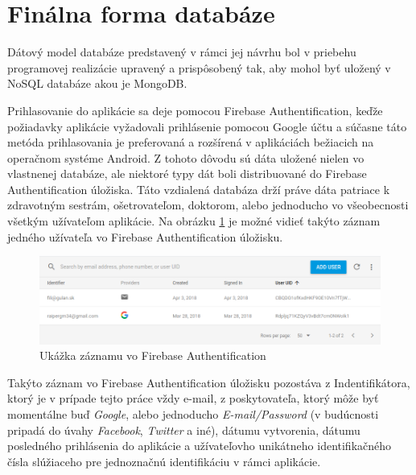 \section{Finálna forma databáze}
Dátový model databáze predstavený v rámci jej návrhu bol v priebehu programovej realizácie upravený a prispôsobený tak, aby mohol byť uložený v NoSQL databáze akou je MongoDB. 

Prihlasovanie do aplikácie sa deje pomocou Firebase Authentification, keďže požiadavky aplikácie vyžadovali prihlásenie pomocou Google účtu a súčasne táto metóda prihlasovania je preferovaná a rozšírená v aplikáciách bežiacich na operačnom systéme Android. Z tohoto dôvodu sú dáta uložené nielen vo vlastnenej databáze, ale niektoré typy dát boli distribuované do Firebase Authentification úložiska. Táto vzdialená databáza drží práve dáta patriace k zdravotným sestrám, ošetrovateľom, doktorom, alebo jednoducho vo všeobecnosti všetkým užívateľom aplikácie. Na obrázku \ref{fig:firebase} je možné vidieť takýto záznam jedného užívateľa vo Firebase Authentification úložisku.
\begin{figure}[h]
  \centering
  \includegraphics[scale=0.45]{fig/firebase.png}
  \caption{Ukážka záznamu vo Firebase Authentification}
  \label{fig:firebase}
\end{figure}
Takýto záznam vo Firebase Authentification úložisku pozostáva z Indentifikátora, ktorý je v prípade tejto práce vždy e-mail, z poskytovateľa, ktorý môže byť momentálne buď \textit{Google}, alebo jednoducho  \textit{E-mail/Password} (v budúcnosti pripadá do úvahy  \textit{Facebook},  \textit{Twitter} a iné), dátumu vytvorenia, dátumu posledného prihlásenia do aplikácie a užívateľovho unikátneho identifikačného čísla slúžiaceho pre jednoznačnú identifikáciu v rámci aplikácie. 

